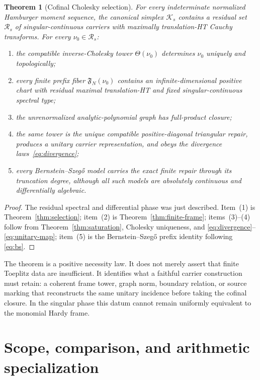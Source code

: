 \documentclass[11pt]{article}
\newtheorem{theorem}{Theorem}[section]
\newcommand{\cK}{\mathcal K}
\newcommand{\cR}{\mathcal R}
\begin{document}
\begin{theorem}[Cofinal Cholesky selection]\label{thm:main}
For every indeterminate normalized Hamburger moment sequence, the canonical simplex $\cK_s$
contains a residual set $\cR_s$ of singular-continuous carriers with maximally translation-HT
Cauchy transforms.  For every $\nu_0\in\cR_s$:
\begin{enumerate}[leftmargin=*,label=\textup{(\arabic*)}]
  \item the compatible inverse-Cholesky tower $\Theta(\nu_0)$ determines $\nu_0$ uniquely and
  topologically;
  \item every finite prefix fiber $\mathfrak F_N(\nu_0)$ contains an infinite-dimensional
  positive chart with residual maximal translation-HT and fixed singular-continuous spectral
  type;
  \item the unrenormalized analytic-polynomial graph has full-product closure;
  \item the same tower is the unique compatible positive-diagonal triangular repair, produces a
  unitary carrier representation, and obeys the divergence laws~\eqref{eq:divergence};
  \item every Bernstein--Szeg\H{o} model carries the exact finite repair through its truncation
  degree, although all such models are absolutely continuous and differentially algebraic.
\end{enumerate}
\end{theorem}

\begin{proof}
The residual spectral and differential phase was just described.  Item~(1) is
Theorem~\ref{thm:selection}; item~(2) is Theorem~\ref{thm:finite-frame}; items~(3)--(4) follow
from Theorem~\ref{thm:saturation}, Cholesky uniqueness, and
\eqref{eq:divergence}--\eqref{eq:unitary-map}; item~(5) is the
Bernstein--Szeg\H{o} prefix identity following \eqref{eq:bs}.
\end{proof}

The theorem is a positive necessity law.  It does not merely assert that finite Toeplitz data are
insufficient.  It identifies what a faithful carrier construction must retain: a coherent frame
tower, graph norm, boundary relation, or source marking that reconstructs the same unitary
incidence before taking the cofinal closure.  In the singular phase this datum cannot remain
uniformly equivalent to the monomial Hardy frame.

\section{Scope, comparison, and arithmetic specialization}\label{sec:scope}
\end{document}
